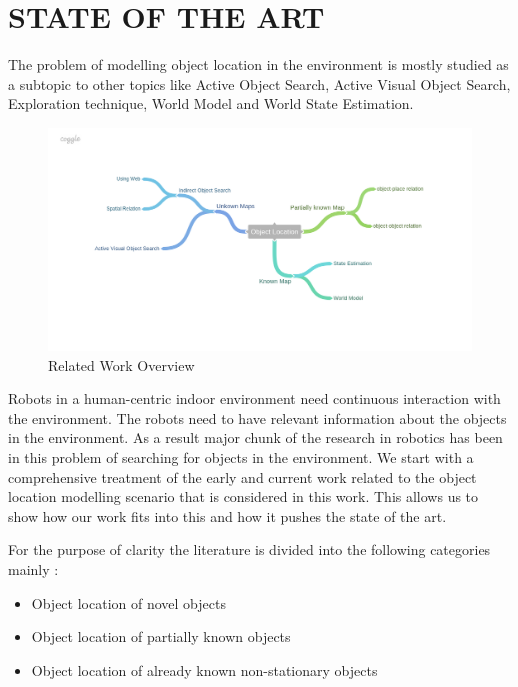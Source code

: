 \chapter{STATE OF THE ART}

The problem of modelling object location in the environment is mostly studied as a subtopic to other topics like Active Object Search, Active Visual Object Search, Exploration technique, World Model and World State Estimation.

\begin{figure}[htp]
\centering
\includegraphics[scale=0.45]{pictures/Object_Location.png}
\caption{Related Work Overview}
\label{Related Work}
\end{figure}

Robots in a human-centric indoor environment need continuous interaction with the environment. The robots need to have relevant information about the objects in the environment. As a result major chunk of the research in robotics has been in this problem of searching for objects in the environment.
We start with a comprehensive treatment of the early and current work related to the object location modelling scenario that is considered in this work. This allows us to show how our work fits into this and how it pushes the state of the art.

For the purpose of clarity the literature is divided into the following categories mainly : 
\begin{itemize}
	\item Object location of novel objects 
	\item Object location of partially known objects
	\item Object location of already known non-stationary objects
\end{itemize}
